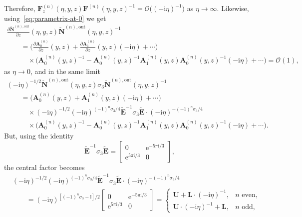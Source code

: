 Therefore, $\mathbf{F}^{(n)}_z(\eta,y,z)\mathbf{F}^{(n)}(\eta,y,z)^{-1}=\mathcal{O}\bigl((-\mathrm{i}\eta)^{-1}\bigr)$ as $\eta\to\infty$. Likewise, using~\eqref{eq:parametrix-at-0} we get
\begin{gather*}
\frac{\partial\breve{\mathbf{N}}^{(n),\mathrm{out}}}{\partial z}(\eta,y,z)\breve{\mathbf{N}}^{(n),\mathrm{out}}(\eta,y,z)^{-1}\\
\qquad {}=\bigg(\frac{\partial\mathbf{A}^{(n)}_0}{\partial z}(y,z) + \frac{\partial\mathbf{A}^{(n)}_1}{\partial z}(y,z) (-\mathrm{i}\eta) +\cdots\bigg)\\
\qquad\quad{}\times\bigl(\mathbf{A}^{(n)}_0(y,z)^{-1} - \mathbf{A}^{(n)}_0(y,z)^{-1}\mathbf{A}^{(n)}_1(y,z)\mathbf{A}_0^{(n)}(y,z)^{-1}(-\mathrm{i}\eta) + \cdots\bigr)=\mathcal{O}(1),
\end{gather*}
as $\eta\to 0$, and in the same limit
\begin{gather*}
(-\mathrm{i}\eta)^{-1/2}\breve{\mathbf{N}}^{(n),\mathrm{out}}(\eta,y,z)\sigma_3\breve{\mathbf{N}}^{(n),\mathrm{out}}(\eta,y,z)^{-1}\\
\qquad =\bigl(\mathbf{A}_0^{(n)}(y,z) + \mathbf{A}_1^{(n)}(y,z)(-\mathrm{i}\eta) + \cdots\bigr)\\
\qquad\quad{}\times (-\mathrm{i}\eta)^{-1/2}(-\mathrm{i}\eta)^{(-1)^n\sigma_3/4}\widetilde{\mathbf{E}}^{-1}\sigma_3\widetilde{\mathbf{E}}\cdot(-\mathrm{i}\eta)^{-(-1)^n\sigma_3/4}\\
\qquad\quad{}\times\bigl(\mathbf{A}^{(n)}_0(y,z)^{-1}-\mathbf{A}_0^{(n)}(y,z)^{-1}\mathbf{A}_1^{(n)}(y,z)\mathbf{A}_0^{(n)}(y,z)^{-1}(-\mathrm{i}\eta) + \cdots\bigr).
\end{gather*}
But, using the identity
\begin{equation*}
\widetilde{\mathbf{E}}^{-1}\sigma_3\widetilde{\mathbf{E}} = \begin{bmatrix}0 & \mathrm{e}^{-5\pi\mathrm{i}/3}\\\mathrm{e}^{5\pi\mathrm{i}/3} & 0\end{bmatrix},
\end{equation*}
the central factor becomes{\samepage
\begin{align}
& (-\mathrm{i}\eta)^{-1/2}(-\mathrm{i}\eta)^{(-1)^n\sigma_3/4}\widetilde{\mathbf{E}}^{-1}\sigma_3\widetilde{\mathbf{E}}\cdot(-\mathrm{i}\eta)^{-(-1)^n\sigma_3/4}
\nonumber\\
&\qquad =(-\mathrm{i}\eta)^{[(-1)^n\sigma_3-\mathbb{I}]/2}\begin{bmatrix}0 & \mathrm{e}^{-5\pi\mathrm{i}/3}\\\mathrm{e}^{5\pi\mathrm{i}/3} & 0\end{bmatrix} =\begin{cases}\mathbf{U} + \mathbf{L}\cdot(-\mathrm{i}\eta)^{-1},&\text{$n$ even}, \\\mathbf{U}\cdot(-\mathrm{i}\eta)^{-1} + \mathbf{L},&\text{$n$ odd},\end{cases} \label{eq:central-factor}
 \end{align}}%

